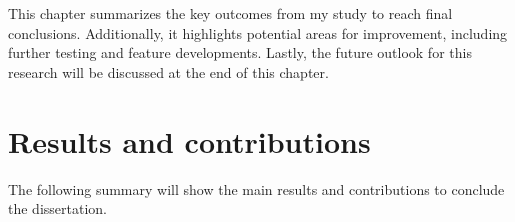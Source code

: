 \begin{chapabstract}
\small{
This chapter summarizes the key outcomes from my study to reach final conclusions. Additionally, it highlights potential areas for improvement, including further testing and feature developments. Lastly, the future outlook for this research will be discussed at the end of this chapter.
}\\
\begin{center}
\noindent\makebox[0.8\linewidth]{\rule{0.66\paperwidth}{0.4pt}}
\end{center}
\vspace{1cm}
\end{chapabstract}


\section{Results and contributions}
\label{s:contributions}
The following summary will show the main results and contributions to conclude the dissertation. 

